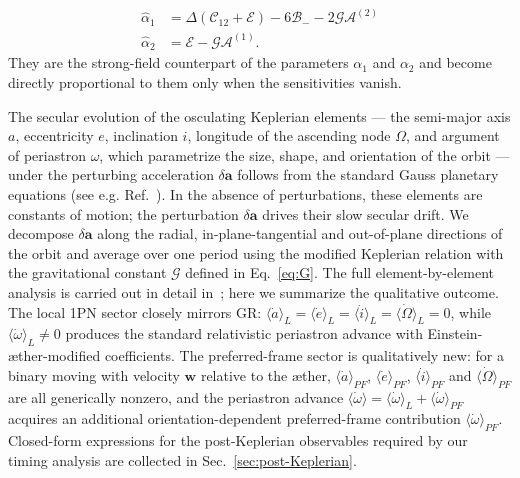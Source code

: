 \documentclass[
    floats,
    floatfix,
    amssymb,
    prd,
    twocolumn,
    superscriptaddress,
    nofootinbib,
    unicode,
    colorlinks=true,
    linktocpage=true
]{revtex4-2}
\begin{document}
\begin{align}
\hat{\alpha}_1 &= \Delta(\mathcal{C}_{12} + \mathcal{E}) - 6\mathcal{B}_- - 2\mathcal{G}\mathcal{A}^{(2)} \label{eq:alpha_strong1}\\
\hat{\alpha}_2 &= \mathcal{E} - \mathcal{G}\mathcal{A}^{(1)}. \label{eq:alpha_strong2}
\end{align}
%
They are the strong-field counterpart of the parameters $\alpha_1$ and $\alpha_2$ and become directly proportional to them only when the sensitivities vanish.

The secular evolution of the osculating Keplerian elements — the semi-major axis $a$, eccentricity $e$, inclination $i$, longitude of the ascending node $\Omega$, and argument of periastron $\omega$, which parametrize the size, shape, and orientation of the orbit — under the perturbing acceleration $\delta\mathbf{a}$ follows from the standard Gauss planetary equations (see e.g. Ref.~\cite{Will_2018}). In the absence of perturbations, these elements are constants of motion; the perturbation $\delta\mathbf{a}$  drives their slow secular drift. We decompose $\delta\mathbf{a}$ along the radial, in-plane-tangential and out-of-plane directions of the orbit and average over one period using the modified Keplerian relation with the gravitational constant $\mathcal{G}$ defined in Eq.~\eqref{eq:G}. The full element-by-element analysis is carried out in detail in~\cite{Gupta_2021}; here we summarize the qualitative outcome. The local 1PN sector closely mirrors GR: $\langle\dot a\rangle_L = \langle\dot e\rangle_L = \langle\dot i\rangle_L = \langle\dot\Omega\rangle_L = 0$, while $\langle\dot\omega\rangle_L \neq 0$ produces the standard relativistic periastron advance with Einstein-\ae ther-modified coefficients. The preferred-frame sector is qualitatively new: for a binary moving with velocity $\mathbf w$ relative to the \ae ther, $\langle\dot a\rangle_{PF}$, $\langle\dot e\rangle_{PF}$, $\langle\dot i\rangle_{PF}$ and $\langle\dot\Omega\rangle_{PF}$ are all generically nonzero, and the periastron advance $\langle\dot\omega\rangle = \langle\dot\omega\rangle_L + \langle\dot\omega\rangle_{PF}$ acquires an additional orientation-dependent preferred-frame contribution $\langle\dot\omega\rangle_{PF}$. Closed-form expressions for the post-Keplerian observables required by our timing analysis are collected in Sec.~\ref{sec:post-Keplerian}.
\end{document}
